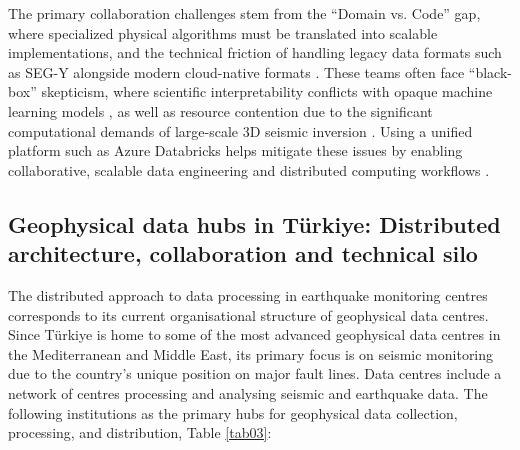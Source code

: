 \documentclass[data,article,submit,pdftex,moreauthors]{Definitions/mdpi}
\begin{document}
The primary collaboration challenges stem from the “Domain vs. Code” gap, where specialized physical algorithms must be translated into scalable implementations, and the technical friction of handling legacy data formats such as SEG-Y alongside modern cloud-native formats \cite{Hall2019,OpenVDS2019}. These teams often face “black-box” skepticism, where scientific interpretability conflicts with opaque machine learning models \cite{Rudin2019}, as well as resource contention due to the significant computational demands of large-scale 3D seismic inversion \cite{Virieux2009}. Using a unified platform such as Azure Databricks helps mitigate these issues by enabling collaborative, scalable data engineering and distributed computing workflows \cite{Armbrust2018a,Databricks2020}.

\subsection{Geophysical data hubs in Türkiye: Distributed architecture, collaboration and technical silo}
The distributed approach to data processing in earthquake monitoring centres corresponds to its current organisational structure of geophysical data centres. Since Türkiye is home to some of the most advanced geophysical data centres in the Mediterranean and Middle East, its primary focus is on seismic monitoring due to the country’s unique position on major fault lines. Data centres include a network of centres processing and analysing seismic and earthquake data. The following institutions as the primary hubs for geophysical data collection, processing, and distribution, Table \ref{tab03}:

\end{document}
